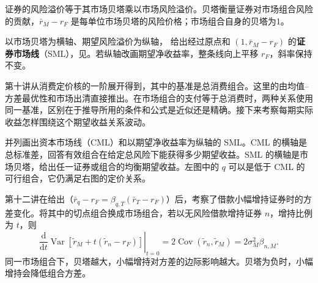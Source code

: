 证券的风险溢价等于其市场贝塔乘以市场风险溢价。贝塔衡量证券对市场组合风险的贡献，$\bar r_M-r_F$ 是每单位市场贝塔的风险价格；市场组合自身的贝塔为1。

以市场贝塔为横轴、期望风险溢价为纵轴， 给出经过原点和 $(1,\bar r_M-r_F)$ 的\textbf{证券市场线}（SML），见。若纵轴改画期望净收益率，整条线向上平移 $r_F$，斜率保持不变。

\begin{center}
\begin{minipage}{\linewidth}
\centering
{}%
\par
{}
\end{minipage}
\end{center}

第十讲从消费定价核的一阶展开得到，其中的基准是总消费组合。这里的由均值--方差最优性和市场出清直接推出。在市场组合的支付等于总消费时，两种关系使用同一基准，区别在于推导所用的条件和公式是近似还是精确。接下来考察每期实际收益怎样围绕这个期望收益关系波动。

并列画出资本市场线（CML）和以期望净收益率为纵轴的 SML。CML 的横轴是总标准差，回答有效组合在给定总风险下能获得多少期望收益。SML 的横轴是市场贝塔，给出任一证券或组合的均衡期望收益。左图中的 $q$ 可以是低于 CML 的可行组合，它仍满足右图的定价关系。

\begin{center}
\begin{minipage}{\linewidth}
\centering
\renewcommand{\thewjFigure}{\thechapter.S\arabic{wjFigure}}%
%
\par
{}
\end{minipage}
\end{center}

第十二讲在给出（$\bar r_q-r_F=\beta_{q,T}(\bar r_T-r_F)$）后，考察了借款小幅增持证券时的方差变化。将其中的切点组合换成市场组合，若以无风险借款增持证券 $n$，增持比例为 $t$，则
\[
 \left.\frac{\mathrm d}{\mathrm dt}
 \operatorname{Var}[\widetilde r_M+t(\widetilde r_n-r_F)]
 \right|_{t=0}
 =2\operatorname{Cov}(\widetilde r_n,\widetilde r_M)
 =2\sigma_M^2\beta_{n,M}.
\]
同一市场组合下，贝塔越大，小幅增持对方差的边际影响越大。贝塔为负时，小幅增持会降低组合方差。

